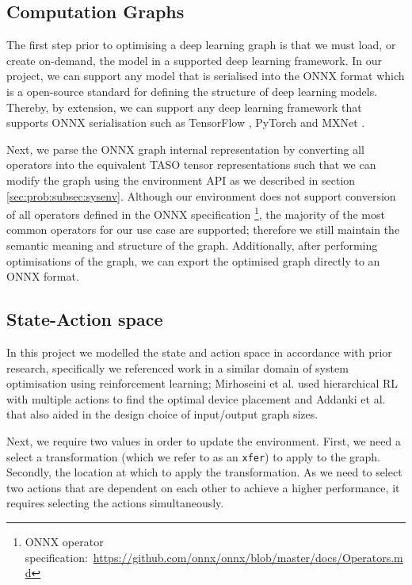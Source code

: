 \subsection{Computation Graphs}
The first step prior to optimising a deep learning graph is that we must load, or create on-demand, the model in a supported deep learning framework. In our project, we can support any model that is serialised into the ONNX \cite{bai2019onnx} format which is a open-source standard for defining the structure of deep learning models. Thereby, by extension, we can support any deep learning framework that supports ONNX serialisation such as TensorFlow \cite{tensorflow2015-whitepaper}, PyTorch \cite{pytorch} and MXNet \cite{chen2015mxnet}.

Next, we parse the ONNX graph internal representation by converting all operators into the equivalent TASO tensor representations such that we can modify the graph using the environment API as we described in section \ref{sec:prob:subsec:sysenv}. Although our environment does not support conversion of all operators defined in the ONNX specification \footnote{ONNX operator specification:~\url{https://github.com/onnx/onnx/blob/master/docs/Operators.md}}, the majority of the most common operators for our use case are supported; therefore we still maintain the semantic meaning and structure of the graph. Additionally, after performing optimisations of the graph, we can export the optimised graph directly to an ONNX format.

\subsection{State-Action space}
\label{sec:prob:subsec:sap}
In this project we modelled the state and action space in accordance with prior research, specifically we referenced work in a similar domain of system optimisation using reinforcement learning; Mirhoseini et al. \cite{mirhoseini2018hierarchical} used hierarchical RL with multiple actions to find the optimal device placement and Addanki et al. \cite{addanki2019placeto} that also aided in the design choice of input/output graph sizes.

Next, we require two values in order to update the environment. First, we need a select a transformation (which we refer to as an \texttt{xfer}) to apply to the graph. Secondly, the location at which to apply the transformation. As we need to select two actions that are dependent on each other to achieve a higher performance, it requires selecting the actions simultaneously.

